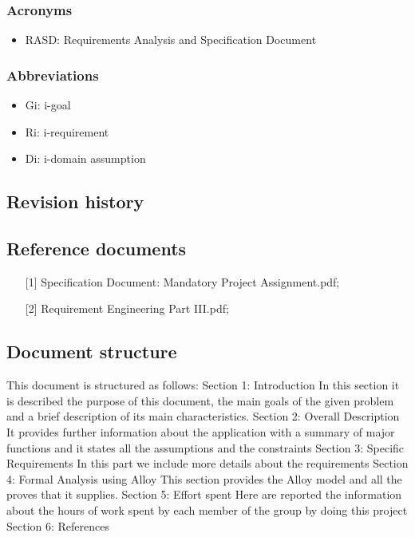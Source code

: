 \documentclass[12pt,titlepage]{article}
\begin{document}
\subsubsection{Acronyms}\label{RASD}
\begin{itemize}
\item	RASD: Requirements Analysis and Specification Document
\end{itemize}
\subsubsection{Abbreviations}\label{RASD}
\begin{itemize}
\item	Gi: i-goal
\item	Ri: i-requirement
\item	Di: i-domain assumption
\end{itemize}
\subsection{Revision history}\label{RASD}

\subsection{Reference documents}\label{RASD}
\begin{itemize}
\item	[{[1]}]Specification Document: Mandatory Project Assignment.pdf;
\item [{[2]}]	Requirement Engineering Part III.pdf;
\end{itemize}
\subsection{Document structure}\label{RASD}
This document is structured as follows:
Section 1: Introduction
In this section it is described the purpose of this document, the main goals of the given problem and a brief description of its main characteristics. 
Section 2: Overall Description
It provides further information about the application with a summary of major functions and it states all the assumptions and the constraints 
Section 3: Specific Requirements
In this part we include more details about the requirements 
Section 4: Formal Analysis using Alloy
This section provides the Alloy model and all the proves that it supplies.
Section 5: Effort spent
Here are reported the information about the hours of work spent by each member of the group by doing this project 
Section 6: References
\end{document}
